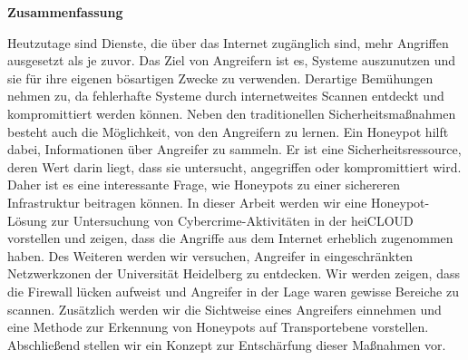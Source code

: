 \thispagestyle{empty}
\begin{center}
    \begin{minipage}[c][0.48\textheight][b]{0.9\textwidth}
        \small
        \begin{center}
            \textbf{Zusammenfassung}
        \end{center}\par
        \vspace{\baselineskip}
        Heutzutage sind Dienste, die über das Internet zugänglich sind, mehr Angriffen ausgesetzt als je zuvor.
        Das Ziel von Angreifern ist es, Systeme auszunutzen und sie für ihre eigenen bösartigen Zwecke zu verwenden.
        Derartige Bemühungen nehmen zu, da fehlerhafte Systeme durch internetweites Scannen entdeckt und kompromittiert werden können.
        Neben den traditionellen Sicherheitsmaßnahmen besteht auch die Möglichkeit, von den Angreifern zu lernen.
        Ein Honeypot hilft dabei, Informationen über Angreifer zu sammeln.
        Er ist eine Sicherheitsressource, deren Wert darin liegt, dass sie untersucht, angegriffen oder kompromittiert wird.
        Daher ist es eine interessante Frage, wie Honeypots zu einer sichereren Infrastruktur beitragen können.
        In dieser Arbeit werden wir eine Honeypot-Lösung zur Untersuchung von Cybercrime-Aktivitäten in der heiCLOUD vorstellen und zeigen, dass die Angriffe aus dem Internet erheblich zugenommen haben.
        Des Weiteren werden wir versuchen, Angreifer in eingeschränkten Netzwerkzonen der Universität Heidelberg zu entdecken.
        Wir werden zeigen, dass die Firewall lücken aufweist und Angreifer in der Lage waren gewisse Bereiche zu scannen.
        Zusätzlich werden wir die Sichtweise eines Angreifers einnehmen und eine Methode zur Erkennung von Honeypots auf Transportebene vorstellen.
        Abschließend stellen wir ein Konzept zur Entschärfung dieser Maßnahmen vor.
    \end{minipage}\par
    \vfill
\end{center}